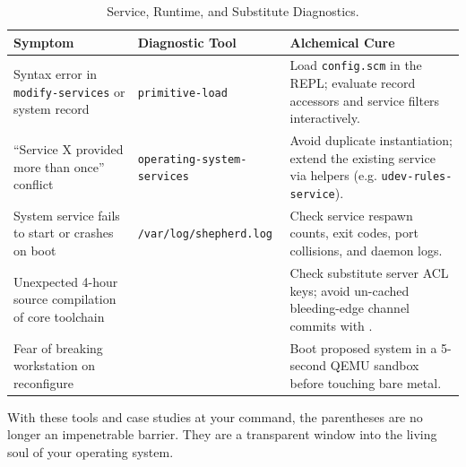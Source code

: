 \begin{table}[htbp]
\centering
\small
\begin{tabularx}{\textwidth}{L{0.27\textwidth} L{0.33\textwidth} Y}
\toprule
\textbf{Symptom} & \textbf{Diagnostic Tool} & \textbf{Alchemical Cure} \\
\midrule
Syntax error in \texttt{modify-services} or system record &
   \newline \texttt{primitive-load} &
  Load \texttt{config.scm} in the REPL; evaluate record accessors and service filters interactively. \\
\addlinespace
``Service X provided more than once'' conflict &
   \newline \texttt{operating-system-services} &
  Avoid duplicate instantiation; extend the existing service via helpers (e.g. \texttt{udev-rules-service}). \\
\addlinespace
System service fails to start or crashes on boot &
   \newline \texttt{/var/log/shepherd.log} &
  Check service respawn counts, exit codes, port collisions, and daemon logs. \\
\addlinespace
Unexpected 4-hour source compilation of core toolchain &
   \newline {} &
  Check substitute server ACL keys; avoid un-cached bleeding-edge channel commits with . \\
\addlinespace
Fear of breaking workstation on reconfigure &
   &
  Boot proposed system in a 5-second QEMU sandbox before touching bare metal. \\
\bottomrule
\end{tabularx}
\caption{Service, Runtime, and Substitute Diagnostics.}
\end{table}

With these tools and case studies at your command, the parentheses are no longer an impenetrable barrier. They are a transparent window into the living soul of your operating system.
